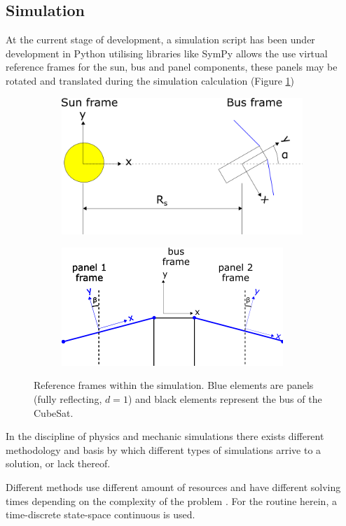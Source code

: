 \subsection{Simulation}

At the current stage of development, a simulation script has been under development in Python utilising libraries like SymPy allows the use virtual reference frames for the sun, bus and panel components, these panels may be rotated and translated during the simulation calculation (Figure \ref{fig:sim_frames})

\begin{figure}[!htb]
\centering
\begin{subfigure}{0.5\textwidth}
  \centering
  \includegraphics[width=0.7\linewidth]{images/sun bus frames.png}
\end{subfigure}%
\begin{subfigure}{.5\textwidth}
  \centering
  \includegraphics[width=0.7\linewidth]{images/bus panel frames.png}
\end{subfigure}
\caption{Reference frames within the simulation. Blue elements are panels (fully reflecting, $d = 1$) and black elements represent the bus of the CubeSat.}
\label{fig:sim_frames}
\end{figure}

In the discipline of physics and mechanic simulations there exists different methodology and basis by which different types of simulations arrive to a solution, or lack thereof.


Different methods use different amount of resources and have different solving times depending on the complexity of the problem \protect\cite{simulations}. For the routine herein, a time-discrete state-space continuous is used.

